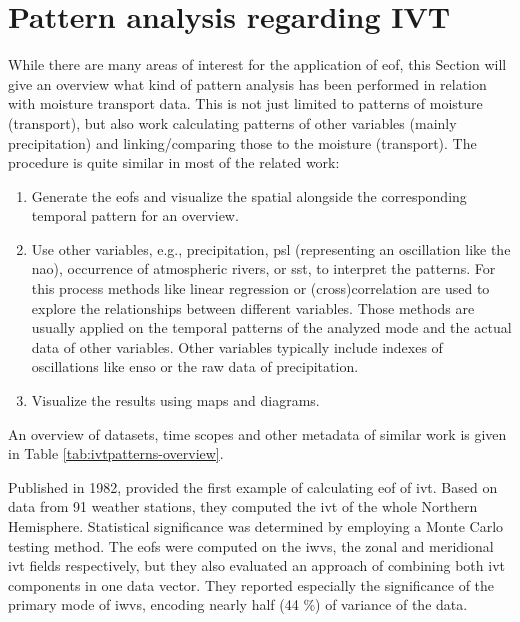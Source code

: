 \section{Pattern analysis regarding IVT}
\label{sec:related_pattern_analysis}





While there are many areas of interest for the application of \ac{eof}, this Section will give an overview what kind of pattern analysis has been performed in relation with moisture transport data.
This is not just limited to patterns of moisture (transport), but also work calculating patterns of other variables (mainly precipitation) and linking/comparing those to the moisture (transport). 
The procedure is quite similar in most of the related work: 

\begin{enumerate}[noitemsep]
  \item Generate the \acp{eof} and  visualize the spatial alongside the corresponding temporal pattern for an overview. 
  \item Use other variables, e.g., precipitation, \ac{psl} (representing an oscillation like the \ac{nao}), occurrence of atmospheric rivers, or \ac{sst}, to interpret the patterns. For this process methods like linear regression or (cross)correlation are used to explore the relationships between different variables. Those methods are usually applied on the temporal patterns of the analyzed mode and the actual data of other variables. Other variables typically include indexes of oscillations like \ac{enso} \cite{ayantobo_integrated_2022, kim_ensos_2015} or the raw data of precipitation. 
  \item Visualize the results using maps and diagrams. 
\end{enumerate}

An overview of datasets, time scopes and other metadata of similar work is given in Table \ref{tab:ivtpatterns-overview}.

Published in 1982,  provided the first example of calculating \ac{eof} of \ac{ivt}. 
Based on data from 91 weather stations, they computed the \ac{ivt} of the whole Northern Hemisphere. 
Statistical significance was determined by employing a Monte Carlo testing method. 
The \acp{eof} were computed on the \acp{iwv}, the zonal and meridional \ac{ivt} fields respectively, but they also evaluated an approach of combining both \ac{ivt} components in one data vector. 
They reported especially the significance of the primary mode of \acp{iwv}, encoding nearly half (44 \%) of variance of the data.

